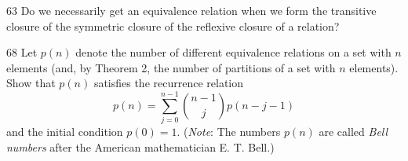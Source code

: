 \documentclass[11pt]{article}
\begin{document}
\begin{exercise}{63}
    Do we necessarily get an equivalence relation when we form the
    transitive closure of the symmetric closure of the reflexive
    closure of a relation?
\end{exercise}

\begin{exercise}{68}
    Let $p(n)$ denote the number of different equivalence relations on
    a set with $n$ elements (and, by Theorem 2, the number of
    partitions of a set with $n$ elements). Show that $p(n)$ satisfies
    the recurrence relation
    \[
    p(n) = \sum_{j=0}^{n-1} \binom{n-1}{j} p(n-j-1)
    \]
    and the initial condition $p(0) = 1$. (\emph{Note}: The numbers
    $p(n)$ are called \emph{Bell numbers} after the American
    mathematician E. T. Bell.)
\end{exercise}
\end{document}
